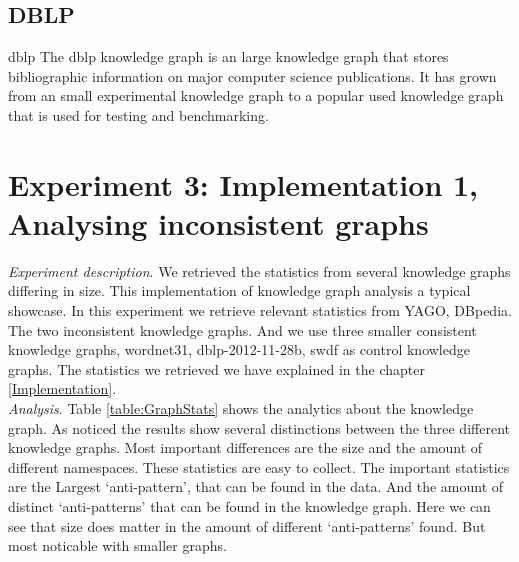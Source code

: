 \documentclass[11pt,letterpaper ,oneside ]{book}
\begin{document}
\subsection{DBLP}
dblp\cite{DBLP} The dblp knowledge graph is an large knowledge graph that stores bibliographic information on major computer science publications. It has grown from an small experimental knowledge graph to a popular used knowledge graph that is used for testing and benchmarking.

\section{Experiment 3: Implementation 1, Analysing inconsistent graphs}
\textit{Experiment description}. We retrieved the statistics from several knowledge graphs differing in size. This implementation of knowledge graph analysis a typical showcase. In this experiment we retrieve relevant statistics from YAGO, DBpedia. The two inconsistent knowledge graphs. And we use three smaller consistent knowledge graphs, wordnet31, dblp-2012-11-28b, swdf as control knowledge graphs. The statistics we retrieved we have explained in the chapter \ref{Implementation}.  \\

\textit{Analysis}. Table \ref{table:GraphStats} shows the analytics about the knowledge graph. As noticed the results show several distinctions between the three different knowledge graphs. Most important differences are the size and the amount of different namespaces. These statistics are easy to collect. The important statistics are the Largest `anti-pattern', that can be found in the data. And the amount of distinct `anti-patterns' that can be found in the knowledge graph. Here we can see that size does matter in the amount of different `anti-patterns' found. But most noticable with smaller graphs. \\
\end{document}
